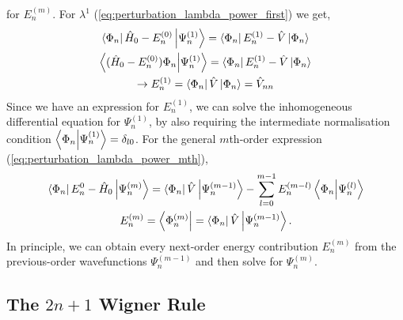 for $E_n^{(m)}$. 
For $\lambda^1$ (\autoref{eq:perturbation_lambda_power_first}) we get,
\begin{equation}
    \begin{gathered}
    \bra{\Phi_n} \hat{H}_0 - E_n^{(0)}\ket{\Psi_n^{(1)}}
        = \bra{\Phi_n} E_n^{(1)} - \hat{V}\ket{\Phi_n} \\
    \bra{(\hat{H}_0 - E_n^{(0)})\Phi_n} \ket{\Psi_n^{(1)}}
        = \bra{\Phi_n} E_n^{(1)} - \hat{V}\ket{\Phi_n} \\
    \to E_n^{(1)} = \bra{\Phi_n} \hat{V} \ket{\Phi_n} = \hat{V}_{nn}
    \end{gathered}
\end{equation}
Since we have an expression for $E_n^{(1)}$, we can solve the inhomogeneous 
differential equation for $\Psi_n^{(1)}$, by also requiring the intermediate
normalisation condition $\braket{\Phi_n}{\Psi_n^{(1)}} = \delta_{l0}$. For 
the general $m$th-order expression (\autoref{eq:perturbation_lambda_power_mth}),
\begin{equation}
    \begin{gathered}
        \bra{\Phi_n} E_n^{0} - \hat{H}_0\ket{\Psi_n^{(m)}}
            = \bra{\Phi_n} \hat{V} \ket{\Psi_n^{(m-1)}}
            - \sum_{l=0}^{m-1}E_n^{(m-l)}\braket{\Phi_n}{\Psi_n^{(l)}} \\
        E_n^{(m)} = \bra{\Phi_n^{(m)}} = \bra{\Phi_n} \hat{V} \ket{\Psi_n^{(m-1)}}.
    \end{gathered}
\end{equation} 
In principle, we can obtain every next-order energy contribution $E_n^{(m)}$ from 
the previous-order wavefunctions $\Psi_n^{(m-1)}$ and then solve for $\Psi_n^{(m)}$.

\subsection{The $2n+1$ Wigner Rule}

